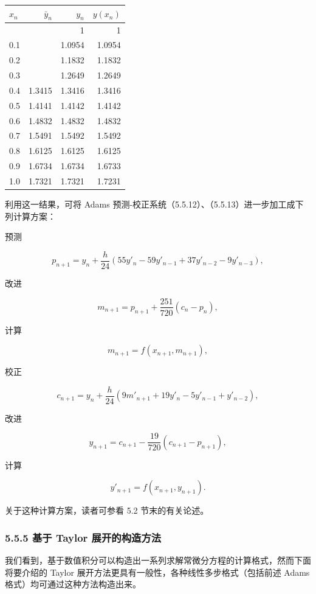 {\def\LTcaptype{none} %
\begin{longtable}[]{@{}lrrr@{}}
\toprule\noalign{}
\(x_n\) & \(\bar y_n\) & \(y_n\) & \(y(x_n)\) \\
\midrule\noalign{}
\endhead
\bottomrule\noalign{}
\endlastfoot
0 & & 1 & 1 \\
0.1 & & 1.0954 & 1.0954 \\
0.2 & & 1.1832 & 1.1832 \\
0.3 & & 1.2649 & 1.2649 \\
0.4 & 1.3415 & 1.3416 & 1.3416 \\
0.5 & 1.4141 & 1.4142 & 1.4142 \\
0.6 & 1.4832 & 1.4832 & 1.4832 \\
0.7 & 1.5491 & 1.5492 & 1.5492 \\
0.8 & 1.6125 & 1.6125 & 1.6125 \\
0.9 & 1.6734 & 1.6734 & 1.6733 \\
1.0 & 1.7321 & 1.7321 & 1.7231 \\
\end{longtable}
}

利用这一结果，可将 Adams 预测-校正系统（5.5.12）、（5.5.13）进一步加工成下列计算方案：

预测

\[
p_{n+1}=y_n+\frac h{24}(55y'_n-59y'_{n-1}+37y'_{n-2}-9y'_{n-3}),
\]

改进

\[
m_{n+1}=p_{n+1}+\frac{251}{720}(c_n-p_n),
\]

计算

\[
m_{n+1}=f(x_{n+1},m_{n+1}),
\]

校正

\[
c_{n+1}=y_n+\frac h{24}(9m'_{n+1}+19y'_n-5y'_{n-1}+y'_{n-2}),
\]

改进

\[
y_{n+1}=c_{n+1}-\frac{19}{720}(c_{n+1}-p_{n+1}),
\]

计算

\[
y'_{n+1}=f(x_{n+1},y_{n+1}).
\]

关于这种计算方案，读者可参看 5.2 节末的有关论述。

\subsubsection{5.5.5 基于 Taylor 展开的构造方法}\label{ch05b-ux57faux4e8e-taylor-ux5c55ux5f00ux7684ux6784ux9020ux65b9ux6cd5}

我们看到，基于数值积分可以构造出一系列求解常微分方程的计算格式，然而下面将要介绍的 Taylor 展开方法更具有一般性，各种线性多步格式（包括前述 Adams 格式）均可通过这种方法构造出来。

